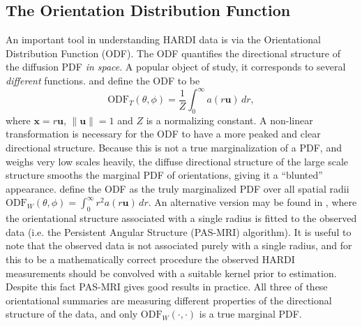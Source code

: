 \documentclass[dvips,aoas,preprint]{imsart}
\numberwithin{equation}{section}
\theoremstyle{plain}
\newcommand{\uu}{\mathbf{u}}
\newcommand{\x}{\mathbf{x}}
\begin{document}
\subsection{The Orientation Distribution Function}

An important tool in understanding HARDI data is via the Orientational
Distribution Function (ODF).  The ODF quantifies the directional
structure of the diffusion PDF {\em in space}.  A popular object of
study, it corresponds to several {\em different} functions.
\citet{Tuch} and \citet{Hess,Descoteaux} define the ODF to be
\begin{equation}
  \text{ODF}_T(\theta,\phi) = \frac{1}{Z} \int_0^{\infty} a(r\uu)\,dr,
\end{equation}
where $\x=r\uu$, $\|\uu\|=1$ and $Z$ is a normalizing constant.  A
non-linear transformation is necessary for the ODF to have a more
peaked and clear directional structure.  Because this is not a true
marginalization of a PDF, and weighs very low scales heavily, the
diffuse directional structure of the large scale structure smooths the
marginal PDF of orientations, giving it a ``blunted'' appearance.
\citet{Wedeen05} define the ODF as the truly marginalized PDF over all
spatial radii
$\text{ODF}_W(\theta,\phi)=\int_0^{\infty}r^2a(r\uu)\,dr$.  An
alternative version may be found in \citep{Jansons}, where the
orientational structure associated with a single radius is fitted to
the observed data (i.e. the Persistent Angular Structure (PAS-MRI)
algorithm).  It is useful to note that the observed data is not
associated purely with a single radius, and for this to be a
mathematically correct procedure the observed HARDI measurements
should be convolved with a suitable kernel prior to estimation.
Despite this fact PAS-MRI gives good results in practice.  All three
of these orientational summaries are measuring different properties of
the directional structure of the data, and only
$\text{ODF}_W(\cdot,\cdot)$ is a true marginal PDF.
\end{document}

